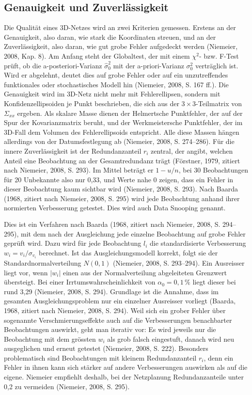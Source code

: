 \subsection{Genauigkeit und Zuverlässigkeit}
\label{sec:Genauigkeit und Zuverlässigkeit}
Die Qualität eines 3D-Netzes wird an zwei Kriterien gemessen. Erstens an der Genauigkeit, also daran, wie stark die Koordinaten streuen, und an der Zuverlässigkeit, also daran, wie gut grobe Fehler aufgedeckt werden (Niemeier, 2008, Kap. 8). 
Am Anfang steht der Globaltest, der mit einem $\chi^2$- bzw. F-Test prüft, ob die a-posteriori-Varianz $\hat{\sigma}_0^2$ mit der a-priori-Varianz $\sigma_0^2$ verträglich ist. Wird er abgelehnt, deutet dies auf grobe Fehler oder auf ein unzutreffendes funktionales oder stochastisches Modell hin (Niemeier, 2008, S. 167 ff.). 
Die Genauigkeit wird im 3D-Netz nicht mehr mit Fehlerellipsen, sondern mit Konfidenzellipsoiden je Punkt beschrieben, die sich aus der $3 \times 3$-Teilmatrix von $\Sigma_{xx}$ ergeben. 
Als skalare Masse dienen der Helmertsche Punktfehler, der auf der Spur der Kovarianzmatrix beruht, und der Werkmeistersche Punktfehler, der im 3D-Fall dem Volumen des Fehlerellipsoids entspricht. Alle diese Massen hängen allerdings von der Datumsfestlegung ab (Niemeier, 2008, S. 274--286). 
Für die innere Zuverlässigkeit ist der Redundanzanteil $r_i$ zentral, der angibt, welchen Anteil eine Beobachtung an der Gesamtredundanz trägt (Förstner, 1979, zitiert nach Niemeier, 2008, S. 293). 
Im Mittel beträgt er $1-u/n$, bei 30 Beobachtungen für 20 Unbekannte also nur 0,33, und Werte nahe 0 zeigen, dass ein Fehler in dieser Beobachtung kaum sichtbar wird (Niemeier, 2008, S. 293). 
Nach Baarda (1968, zitiert nach Niemeier, 2008, S. 295) wird jede Beobachtung anhand ihrer normierten Verbesserung getestet. Dies wird auch Data Snooping genannt. \bigskip 

Dies ist ein Verfahren nach Baarda (1968, zitiert nach Niemeier, 2008, S. 294--295), mit dem nach der Ausgleichung jede einzelne Beobachtung auf grobe Fehler geprüft wird. 
Dazu wird für jede Beobachtung $l_i$ die standardisierte Verbesserung $w_i = v_i / \sigma_{v_i}$ berechnet. Ist das Ausgleichungsmodell korrekt, folgt sie der Standardnormalverteilung $N(0,1)$ (Niemeier, 2008, S. 293--294). 
Ein Ausreisser liegt vor, wenn $\lvert w_i \rvert$ einen aus der Normalverteilung abgeleiteten Grenzwert übersteigt. Bei einer Irrtumswahrscheinlichkeit von $\alpha_0 = 0{,}1\,\%$ liegt dieser bei rund 3,29 (Niemeier, 2008, S. 294). 
Grundlage ist die Annahme, dass im gesamten Ausgleichungsproblem nur ein einzelner Ausreisser vorliegt (Baarda, 1968, zitiert nach Niemeier, 2008, S. 294). 
Weil sich ein grober Fehler über sogenannte Verschmierungseffekte auch auf die Verbesserungen benachbarter Beobachtungen auswirkt, geht man iterativ vor: 
Es wird jeweils nur die Beobachtung mit dem grössten $w_i$ als grob falsch eingestuft, danach wird neu ausgeglichen und erneut getestet (Niemeier, 2008, S. 222). 
Besonders problematisch sind Beobachtungen mit kleinem Redundanzanteil $r_i$, denn ein Fehler in ihnen kann sich stärker auf andere Verbesserungen auswirken als auf die eigene. 
Niemeier empfiehlt deshalb, bei der Netzplanung Redundanzanteile unter 0,2 zu vermeiden (Niemeier, 2008, S. 295).\bigskip 


